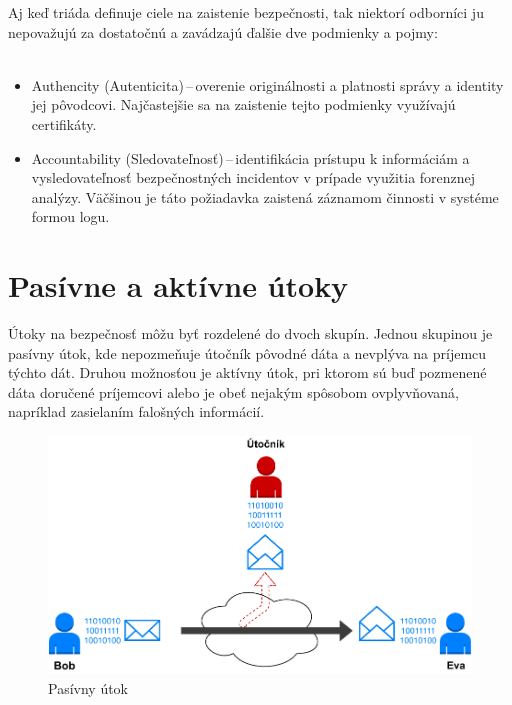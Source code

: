 	Aj keď triáda  definuje ciele na zaistenie bezpečnosti, tak niektorí odborníci ju nepovažujú za dostatočnú a zavádzajú ďalšie dve podmienky a pojmy:\\
	\\
	\begin{itemize}
		\item Authencity (Autenticita)\,--\,overenie originálnosti a platnosti správy a identity jej pôvodcovi. Najčastejšie sa na zaistenie tejto podmienky využívajú certifikáty. \cite{Stallings2011}
		\item Accountability (Sledovateľnosť)\,--\,identifikácia prístupu k informáciám a vysledovateľnosť bezpečnostných incidentov v prípade využitia forenznej analýzy. Väčšinou je táto požiadavka zaistená záznamom činnosti v systéme formou logu. \cite{Stallings2011}
	\end{itemize}





\newpage
\section{Pasívne a aktívne útoky}
Útoky na bezpečnosť môžu byť rozdelené do dvoch skupín. Jednou skupinou je pasívny útok, kde nepozmeňuje útočník pôvodné dáta a nevplýva na príjemcu týchto dát. Druhou možnosťou je aktívny útok, pri ktorom sú buď pozmenené dáta doručené príjemcovi alebo je obeť nejakým spôsobom ovplyvňovaná, napríklad zasielaním falošných informácií. \cite{Vyncke2008}

\begin{figure}[H]
	\begin{center}
		\includegraphics[scale=0.65]{obrazky/passive-attack.pdf}
	\end{center}
	\caption[Pasívny útok]{Pasívny útok}
	\label{passive-attack}
\end{figure}

